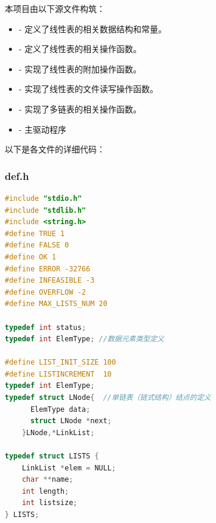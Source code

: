 \documentclass[supercite]{Experimental_Report}
\theoremstyle{definition}
\begin{document}
本项目由以下源文件构筑：
\begin{itemize}
	\item {} - 定义了线性表的相关数据结构和常量。
	\item {} - 定义了线性表的相关操作函数。
	\item {} - 实现了线性表的附加操作函数。
	\item {} - 实现了线性表的文件读写操作函数。
	\item {} - 实现了多链表的相关操作函数。
	\item {} - 主驱动程序
\end{itemize}

以下是各文件的详细代码：

\subsubsection*{def.h}
\begin{lstlisting}[language=C, caption={def.h}, label=lst:def_h_link]
#include "stdio.h"
#include "stdlib.h"
#include <string.h>
#define TRUE 1
#define FALSE 0
#define OK 1
#define ERROR -32766
#define INFEASIBLE -3
#define OVERFLOW -2
#define MAX_LISTS_NUM 20

typedef int status;
typedef int ElemType; //数据元素类型定义

#define LIST_INIT_SIZE 100
#define LISTINCREMENT  10
typedef int ElemType;
typedef struct LNode{  //单链表（链式结构）结点的定义
      ElemType data;
      struct LNode *next;
    }LNode,*LinkList;

typedef struct LISTS {
    LinkList *elem = NULL;
    char **name;
    int length;
    int listsize;
} LISTS; 
\end{lstlisting}
\end{document}
